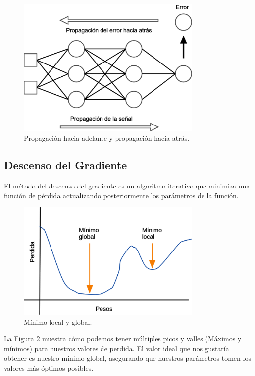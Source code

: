 \begin{figure}[H]
    \centering
    \includegraphics[width=0.8\textwidth]{MarcoTeorico/imgs/Backpropagation.png}
    \caption{Propagación hacia adelante y propagación hacia atrás.}
    \label{fig:backpropagation}
\end{figure}

\subsection{Descenso del Gradiente }

El método del descenso del gradiente es un algoritmo iterativo que minimiza una función de pérdida actualizando posteriormente los parámetros de la función.

\begin{figure}[H]
    \centering
    \includegraphics[width=0.8\textwidth]{MarcoTeorico/imgs/DescensoGradiente.png}
    \caption{Mínimo local y global.}
    \label{fig:descensoGradiente}
\end{figure}

La Figura \ref{fig:descensoGradiente} muestra cómo podemos tener múltiples picos y valles (Máximos y mínimos) para nuestros valores de perdida. El valor ideal que nos gustaría obtener es nuestro mínimo global, asegurando que nuestros parámetros tomen los valores más óptimos posibles.

